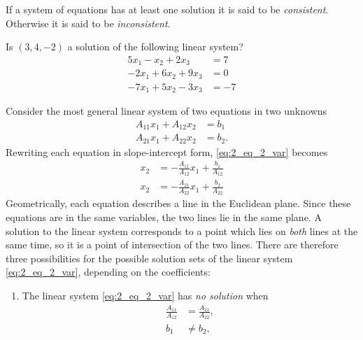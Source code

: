 \documentclass[12pt,letterpaper,reqno]{article}
\numberwithin{equation}{section}
\newcommand{\ti}[1]{\textit{#1}}
\begin{document}
\begin{defn}\label{def:consistent}
If a system of equations has at least one solution it is said to be \ti{consistent}. Otherwise it is said to be \ti{inconsistent}.	
\end{defn}

\begin{exercise}
Is $(3,4,-2)$ a solution of the following linear system?
\begin{align*}
	5x_1-x_2+2x_3 &=7 \\
	-2x_1+6x_2+9x_3&=0 \\
	-7x_1+5x_2-3x_3&=-7
\end{align*} 	
\end{exercise}

\begin{example}\label{ex:two_linear_equations_in_two_unknowns}
Consider the most general linear system of two equations in two unknowns
\begin{equation}\label{eq:2_eq_2_var}
	\begin{split}
				A_{11} x_1+A_{12}x_2&=b_1 \\
		A_{21} x_1+A_{22}x_2&=b_2. 
	\end{split}
\end{equation}	
Rewriting each equation in slope-intercept form, \eqref{eq:2_eq_2_var} becomes
\begin{equation}
	\begin{split}
		x_2&=-\frac{A_{11}}{A_{12}}x_1+\frac{b_1}{A_{12}} \\
		x_2&=-\frac{A_{21}}{A_{22}}x_1+\frac{b_2}{A_{22}}
	\end{split}
\end{equation}
Geometrically, each equation describes a line in the Euclidean plane. Since these equations are in the same variables, the two lines lie in the same plane. A solution to the linear system corresponds to a point which lies on \ti{both} lines at the same time, so it is a point of intersection of the two lines. There are therefore three possibilities for the possible solution sets of the linear system \eqref{eq:2_eq_2_var}, depending on the coefficients:
\begin{enumerate}[(1)]
	\item The linear system \eqref{eq:2_eq_2_var} has \emph{no solution} when 
	\begin{align*}
		\frac{A_{11}}{A_{12}}&=\frac{A_{21}}{A_{22}}, \\
		b_1 & \neq b_2,

\end{align*}
\end{enumerate}
\end{example}
\end{document}
